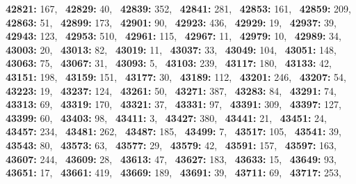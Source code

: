 \textbf{42821:} 167,\allowbreak~ 
\textbf{42829:} 40,\allowbreak~ 
\textbf{42839:} 352,\allowbreak~ 
\textbf{42841:} 281,\allowbreak~ 
\textbf{42853:} 161,\allowbreak~ 
\textbf{42859:} 209,\allowbreak~ 
\textbf{42863:} 51,\allowbreak~ 
\textbf{42899:} 173,\allowbreak~ 
\textbf{42901:} 90,\allowbreak~ 
\textbf{42923:} 436,\allowbreak~ 
\textbf{42929:} 19,\allowbreak~ 
\textbf{42937:} 39,\allowbreak~ 
\textbf{42943:} 123,\allowbreak~ 
\textbf{42953:} 510,\allowbreak~ 
\textbf{42961:} 115,\allowbreak~ 
\textbf{42967:} 11,\allowbreak~ 
\textbf{42979:} 10,\allowbreak~ 
\textbf{42989:} 34,\allowbreak~ 
\textbf{43003:} 20,\allowbreak~ 
\textbf{43013:} 82,\allowbreak~ 
\textbf{43019:} 11,\allowbreak~ 
\textbf{43037:} 33,\allowbreak~ 
\textbf{43049:} 104,\allowbreak~ 
\textbf{43051:} 148,\allowbreak~ 
\textbf{43063:} 75,\allowbreak~ 
\textbf{43067:} 31,\allowbreak~ 
\textbf{43093:} 5,\allowbreak~ 
\textbf{43103:} 239,\allowbreak~ 
\textbf{43117:} 180,\allowbreak~ 
\textbf{43133:} 42,\allowbreak~ 
\textbf{43151:} 198,\allowbreak~ 
\textbf{43159:} 151,\allowbreak~ 
\textbf{43177:} 30,\allowbreak~ 
\textbf{43189:} 112,\allowbreak~ 
\textbf{43201:} 246,\allowbreak~ 
\textbf{43207:} 54,\allowbreak~ 
\textbf{43223:} 19,\allowbreak~ 
\textbf{43237:} 124,\allowbreak~ 
\textbf{43261:} 50,\allowbreak~ 
\textbf{43271:} 387,\allowbreak~ 
\textbf{43283:} 84,\allowbreak~ 
\textbf{43291:} 74,\allowbreak~ 
\textbf{43313:} 69,\allowbreak~ 
\textbf{43319:} 170,\allowbreak~ 
\textbf{43321:} 37,\allowbreak~ 
\textbf{43331:} 97,\allowbreak~ 
\textbf{43391:} 309,\allowbreak~ 
\textbf{43397:} 127,\allowbreak~ 
\textbf{43399:} 60,\allowbreak~ 
\textbf{43403:} 98,\allowbreak~ 
\textbf{43411:} 3,\allowbreak~ 
\textbf{43427:} 380,\allowbreak~ 
\textbf{43441:} 21,\allowbreak~ 
\textbf{43451:} 24,\allowbreak~ 
\textbf{43457:} 234,\allowbreak~ 
\textbf{43481:} 262,\allowbreak~ 
\textbf{43487:} 185,\allowbreak~ 
\textbf{43499:} 7,\allowbreak~ 
\textbf{43517:} 105,\allowbreak~ 
\textbf{43541:} 39,\allowbreak~ 
\textbf{43543:} 80,\allowbreak~ 
\textbf{43573:} 63,\allowbreak~ 
\textbf{43577:} 29,\allowbreak~ 
\textbf{43579:} 42,\allowbreak~ 
\textbf{43591:} 157,\allowbreak~ 
\textbf{43597:} 163,\allowbreak~ 
\textbf{43607:} 244,\allowbreak~ 
\textbf{43609:} 28,\allowbreak~ 
\textbf{43613:} 47,\allowbreak~ 
\textbf{43627:} 183,\allowbreak~ 
\textbf{43633:} 15,\allowbreak~ 
\textbf{43649:} 93,\allowbreak~ 
\textbf{43651:} 17,\allowbreak~ 
\textbf{43661:} 419,\allowbreak~ 
\textbf{43669:} 189,\allowbreak~ 
\textbf{43691:} 39,\allowbreak~ 
\textbf{43711:} 69,\allowbreak~ 
\textbf{43717:} 253,\allowbreak~ 
